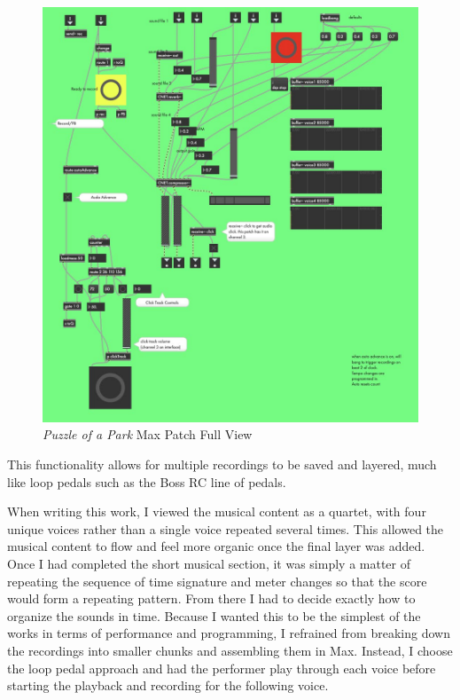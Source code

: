 \begin{figure}
    \centering
    \includegraphics[scale=0.25]{diagrams/maxPatches/puzzleRaw.jpg}
    \caption{\textit{Puzzle of a Park} Max Patch Full View}
    \label{fig:puzzlePatchRaw}
\end{figure}

This functionality allows for multiple recordings to be saved and layered, much like loop pedals such as the Boss RC line of pedals.

When writing this work, I viewed the musical content as a quartet, with four unique voices rather than a single voice repeated several times. This allowed the musical content to flow and feel more organic once the final layer was added. 
Once I had completed the short musical section, it was simply a matter of repeating the sequence of time signature and meter changes so that the score would form a repeating pattern. From there I had to decide exactly how to organize the sounds in time. Because I wanted this to be the simplest of the works in terms of performance and programming, I refrained from breaking down the recordings into smaller chunks and assembling them in Max. Instead, I choose the loop pedal approach and had the performer play through each voice before starting the playback and recording for the following voice. 

